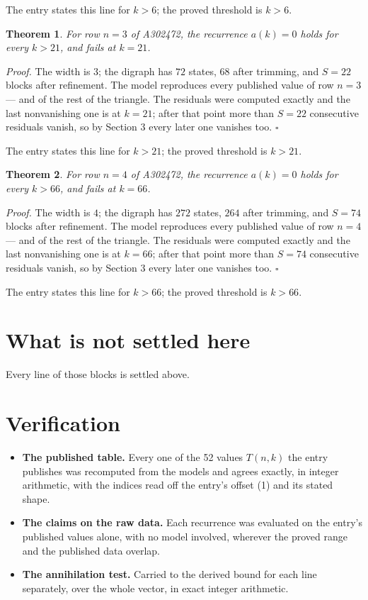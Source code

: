 \documentclass[11pt]{article}
\newtheorem{theorem}{Theorem}
\theoremstyle{definition}
\begin{document}
The entry states this line for $k > 6$; the proved threshold is $k > 6$.

\begin{theorem} For row $n = 3$ of A302472, the recurrence $a(k) = 0$ holds for every $k > 21$, and fails at $k = 21$.\end{theorem}

{\itshape Proof.} The width is $3$; the digraph has $72$ states, $68$ after trimming, and $S = 22$ blocks after refinement. The model reproduces every published value of row $n = 3$ --- and of the rest of the triangle. The residuals were computed exactly and the last nonvanishing one is at $k = 21$; after that point more than $S = 22$ consecutive residuals vanish, so by Section 3 every later one vanishes too. $\square$

The entry states this line for $k > 21$; the proved threshold is $k > 21$.

\begin{theorem} For row $n = 4$ of A302472, the recurrence $a(k) = 0$ holds for every $k > 66$, and fails at $k = 66$.\end{theorem}

{\itshape Proof.} The width is $4$; the digraph has $272$ states, $264$ after trimming, and $S = 74$ blocks after refinement. The model reproduces every published value of row $n = 4$ --- and of the rest of the triangle. The residuals were computed exactly and the last nonvanishing one is at $k = 66$; after that point more than $S = 74$ consecutive residuals vanish, so by Section 3 every later one vanishes too. $\square$

The entry states this line for $k > 66$; the proved threshold is $k > 66$.

\section{What is not settled here}

Every line of those blocks is settled above.

\section{Verification}

\begin{itemize}

\item {\bfseries The published table.} Every one of the 52 values $T(n,k)$ the entry publishes was recomputed from the models and agrees exactly, in integer arithmetic, with the indices read off the entry's offset (1) and its stated shape.

\item {\bfseries The claims on the raw data.} Each recurrence was evaluated on the entry's published values alone, with no model involved, wherever the proved range and the published data overlap.

\item {\bfseries The annihilation test.} Carried to the derived bound for each line separately, over the whole vector, in exact integer arithmetic.

\end{itemize}
\end{document}
